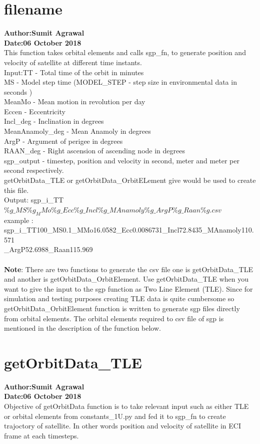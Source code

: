 \documentclass[a4paper, oneside,11pt]{article}
\begin{document}
\section*{filename}
\textbf{Author:Sumit Agrawal}\\
\textbf{Date:06 October 2018}\\
This function takes orbital elements and calls sgp\_fn, to generate position and velocity of satellite at different time instants.\\
Input:TT - Total time of the orbit in minutes\\
MS - Model step time (MODEL\_STEP - step size in environmental data in seconds
)\\		
MeanMo - Mean motion in revolution per day\\
Eccen - Eccentricity\\
Incl\_deg - Inclination in degrees \\
MeanAnamoly\_deg - Mean Anamoly in degrees \\
ArgP - Argument of perigee in degrees \\
RAAN\_deg - Right ascension of ascending node in degrees\\
sgp\_output - timestep, position and velocity in second, meter and meter per second respectively.\\ getOrbitData\_TLE or getOrbitData\_OrbitELement give would be used to create this file.\\ 
Output: sgp\_i\_TT$\%g\_MS\%g_MMo\%g\_Ecc\%g\_Incl\%g\_MAnamoly\%g\_ArgP\%g\_Raan\%g.csv
$\\
example : sgp\_i\_TT100\_MS0.1\_MMo16.0582\_Ecc0.0086731\_Incl72.8435\_MAnamoly110.571 \\
\_ArgP52.6988\_Raan115.969
\\
\\
\textbf{Note}: There are two functions to generate the csv file one is  getOrbitData\_TLE and another is  getOrbitData\_OrbitElement.  Use getOrbitData\_TLE when you want to give the input to the sgp function as Two Line Element (TLE). Since for simulation and testing purposes creating TLE data is quite cumbersome so getOrbitData\_OrbitElement function is written to generate sgp files directly from orbital elements. The orbital elements required to csv file of sgp is mentioned in the description of the function below.

\section*{getOrbitData\_TLE}
\textbf{Author:Sumit Agrawal}\\
\textbf{Date:06 October 2018}\\
Objective of getOrbitData function is to take relevant input such as either TLE or orbital elements from constants\_1U.py and fed it to sgp\_fn to create trajoctory of satellite. In other words position and velocity of satellite in ECI frame at each timesteps.
\end{document}
